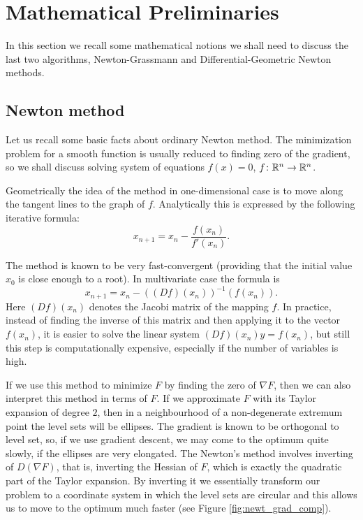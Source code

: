 \section{Mathematical Preliminaries}

In this section we recall some mathematical notions
we shall need to discuss the last two algorithms, 
Newton-Grassmann and Differential-Geometric Newton methods.

\subsection{Newton method}

Let us recall some basic facts about ordinary Newton method. The minimization problem for 
a smooth function is usually reduced to finding zero of the gradient, 
so we shall discuss solving system of equations
$f(x) = 0$, $f \colon \mathbb{R}^n \to \mathbb{R}^n$.

 Geometrically the idea of the method in one-dimensional case is 
to move along the tangent lines to the graph of $f$. Analytically this is expressed by the following iterative formula:
\begin{equation}
 x_{n+1} = x_n - \frac{f(x_n) }{ f'(x_{n})}. 
\end{equation}



The method is known to be very fast-convergent (providing that the initial value $x_0$ is close enough to a root).
In multivariate case the formula is
\begin{equation}
 x_{n+1} = x_n - ((Df)(x_n))^{-1} ( f(x_n) ).
\end{equation}
Here $(Df)(x_n)$ denotes the Jacobi matrix of the mapping $f$. In practice, instead of finding
the inverse of this matrix and then applying it to the vector $f(x_n)$, it is 
easier to solve the linear system $(Df)(x_n) y = f(x_n) $, but still this step is computationally expensive,
especially if the number of variables is high.


If we use this method to minimize $F$ by finding the zero of $\nabla F$, then
we can also interpret this method in terms of $F$. If we approximate $F$
with its Taylor expansion of degree $2$, then in a neighbourhood 
of a non-degenerate extremum point the level sets will be ellipses.
The gradient is known to be orthogonal to level set, so, if we use gradient descent,
we may come to the optimum quite slowly, if the ellipses are very elongated.
The Newton's method involves inverting of $D (\nabla F)$, that is, inverting 
the Hessian of $F$, which is exactly the quadratic part of the Taylor expansion.
By inverting it we essentially transform our problem to a coordinate system in which
the level sets are circular and this allows us to move to the optimum much faster (see Figure \ref{fig:newt_grad_comp}).

